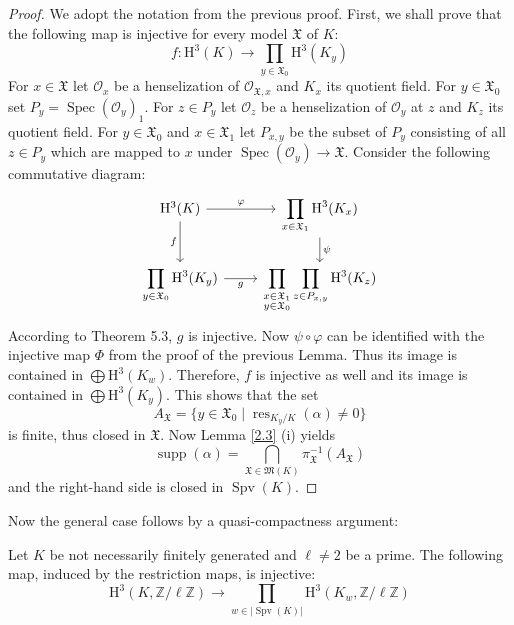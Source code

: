 \begin{proof}
We adopt the notation from the previous proof. First, we shall prove that the following map is injective for every model $\mathfrak{X}$ of $K$:
\[ f: \mathrm{H}^3(K) \longrightarrow \prod_{y\in\mathfrak{X}_0}\mathrm{H}^3(K_y) \]
For $x\in\mathfrak{X}$ let $\mathcal{O}_x$ be a henselization of $\mathcal{O}_{\mathfrak{X}, x}$ and $K_x$ its quotient field. For $y\in\mathfrak{X}_0$ set $P_y=\operatorname{Spec}(\mathcal{O}_y)_1$. For $z\in P_y$ let $\mathcal{O}_z$ be a henselization of $\mathcal{O}_y$ at $z$ and $K_z$ its quotient field. For $y\in\mathfrak{X}_0$ and $x\in\mathfrak{X}_1$ let $P_{x,y}$ be the subset of $P_y$ consisting of all $z\in P_y$ which are mapped to $x$ under $\operatorname{Spec}(\mathcal{O}_y)\to\mathfrak{X}$. Consider the following commutative diagram:
\[ \begin{tikzcd}
\mathrm{H}^3(K)\ar[r, "\varphi"]\ar[d, "f"'] & \displaystyle\prod_{x\in\mathfrak{X}_1}\mathrm{H}^3(K_x)\ar[d, "\psi"]\\
\displaystyle\prod_{y\in\mathfrak{X}_0}\mathrm{H}^3(K_y) \ar[r, "g"']& \displaystyle\prod_{\substack{x\in\mathfrak{X}_1 \\ y\in\mathfrak{X}_0}}\prod_{z\in P_{x,y}}\mathrm{H}^3(K_z)
\end{tikzcd} \]
According to \cite{Sa87} Theorem 5.3, $g$ is injective. Now $\psi\circ\varphi$ can be identified with the injective map $\Phi$ from the proof of the previous Lemma. Thus its image is contained in $\bigoplus\mathrm{H}^3(K_w)$. Therefore, $f$ is injective as well and its image is contained in $\bigoplus\mathrm{H}^3(K_y)$. This shows that the set
\[ A_\mathfrak{X} = \{ y\in\mathfrak{X}_0\mid \operatorname{res}_{K_y/K}(\alpha)\neq 0 \} \]
is finite, thus closed in $\mathfrak{X}$. Now Lemma \ref{2.3} (i) yields
\[ \operatorname{supp}(\alpha) = \bigcap_{\mathfrak{X}\in \mathfrak{M}(K)} \pi_\mathfrak{X}^{-1}(A_\mathfrak{X}) \]
and the right-hand side is closed in $\operatorname{Spv}(K)$.
\end{proof}

Now the general case follows by a quasi-compactness argument:

\begin{lemma}\label{2.4}
Let $K$ be not necessarily finitely generated and $\ell\neq 2$ be a prime. The following map, induced by the restriction maps, is injective:
\[ \mathrm{H}^3(K,\mathbb{Z}/\ell\mathbb{Z})\longrightarrow \prod_{w\in |\operatorname{Spv}(K)| }\mathrm{H}^3(K_w,\mathbb{Z}/\ell\mathbb{Z}) \]
\end{lemma}


